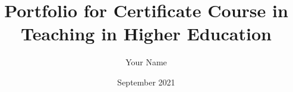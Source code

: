 \documentclass[a4paper,12pt]{book}
\begin{document}
\author{Your Name}
\title{Portfolio for Certificate Course in Teaching in Higher Education}
\date{September 2021}

\frontmatter
\maketitle
\tableofcontents

\mainmatter











\backmatter
\end{document}
